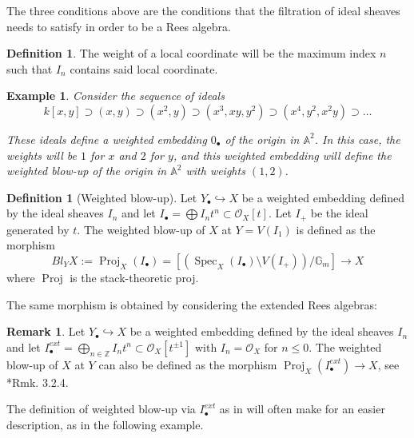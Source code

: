 \documentclass{amsart}
\newcommand{\bA}{\mathbb{A}}
\newcommand{\bG}{\mathbb{G}}
\newcommand{\bZ}{\mathbb{Z}}
\newcommand{\cO}{\mathcal{O}}
\newcommand{\stProj}{\operatorname{Proj}}
\newcommand{\spec}{\operatorname{Spec}}
\newtheorem{example}[theorem]{Example}
\theoremstyle{definition}
\newtheorem{Def}[theorem]{Definition}
\newtheorem{Remark}[theorem]{Remark}
\begin{document}
The three conditions above are the conditions that the filtration of ideal sheaves needs to satisfy in order to be a Rees algebra. 

\begin{Def}The weight of a local coordinate will be the maximum index $n$ such that $I_n$ contains said local coordinate. \end{Def}

\begin{example}\label{embeddingoftheorigin}
    Consider the sequence of ideals 
    $$k[x,y] \supset (x,y) \supset (x^2, y) \supset (x^3, xy, y^2) \supset (x^4, y^2, x^2y) \supset \dots$$

    These ideals define a weighted embedding $0_\bullet$ of the origin in $\bA^2$.
    In this case, the weights will be $1$ for $x$ and $2$ for $y$, and this weighted embedding will define the weighted blow-up of the origin in $\bA^2$ with weights $(1,2)$. 

\end{example}



\begin{Def}[Weighted blow-up]
Let $Y_\bullet \hookrightarrow X$ be a weighted embedding defined by the ideal sheaves $I_n$ and let $I_\bullet=\bigoplus I_nt^n \subset \cO_X[t]$. Let $I_{+}$ be the ideal generated by $t$.
The weighted blow-up of $X$ at $Y=V(I_1)$ is defined as the morphism $$Bl_{Y}X:=\stProj_X\left(I_\bullet\right)=[(\spec_X(I_\bullet) \setminus V(I_+))/\bG_m] \rightarrow X$$ where $\stProj$ is the stack-theoretic proj. 
\end{Def}

The same morphism is obtained by considering the extended Rees algebras:
\begin{Remark}\label{def_wblowup_algebra_in_all_degrees}
Let $Y_\bullet \hookrightarrow X$ be a weighted embedding defined by the ideal sheaves $I_n$ and let $I_\bullet^{ext}=\bigoplus_{n \in \bZ} I_nt^n \subset \cO_X[t^{\pm 1}]$ with $I_n = \cO_X $ for $n \le 0$. The weighted blow-up of $X$ at $Y$ can also be defined as the morphism $\stProj_X\left(I_\bullet^{ext}\right)\rightarrow X$, see \cite{QR}*{Rmk. 3.2.4}.
\end{Remark}

The definition of weighted blow-up via $I_\bullet^{ext}$ as in  will often make for an easier description, as in the following example. 
\end{document}
